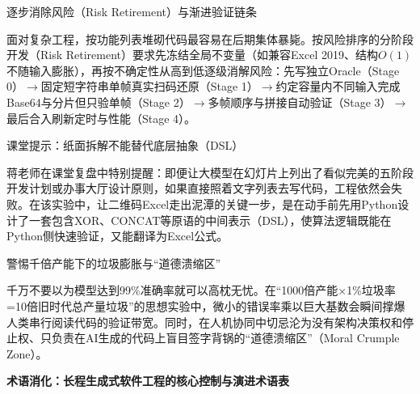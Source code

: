 \documentclass[UTF8,a4paper,11pt,fontset=fandol]{ctexart}
\begin{document}
\begin{importantbox}{逐步消除风险（Risk Retirement）与渐进验证链条}

面对复杂工程，按功能列表堆砌代码最容易在后期集体暴毙。按风险排序的分阶段开发（Risk Retirement）要求先冻结全局不变量（如兼容Excel 2019、结构\(O(1)\)不随输入膨胀），再按不确定性从高到低逐级消解风险：先写独立Oracle（Stage 0）\ensuremath{\rightarrow}固定短字符串单帧真实扫码还原（Stage 1）\ensuremath{\rightarrow}约定容量内不同输入完成Base64与分片但只验单帧（Stage 2）\ensuremath{\rightarrow}多帧顺序与拼接自动验证（Stage 3）\ensuremath{\rightarrow}最后合入刷新定时与性能（Stage 4）。

\end{importantbox}

\begin{knowledgebox}{课堂提示：纸面拆解不能替代底层抽象（DSL）}

蒋老师在课堂复盘中特别提醒：即便让大模型在幻灯片上列出了看似完美的五阶段开发计划或办事大厅设计原则，如果直接照着文字列表去写代码，工程依然会失败。在该实验中，让二维码Excel走出泥潭的关键一步，是在动手前先用Python设计了一套包含XOR、CONCAT等原语的中间表示（DSL），使算法逻辑既能在Python侧快速验证，又能翻译为Excel公式。

\end{knowledgebox}

\begin{warningbox}{警惕千倍产能下的垃圾膨胀与“道德溃缩区”}

千万不要以为模型达到99\%准确率就可以高枕无忧。在“1000倍产能\ensuremath{\times}1\%垃圾率=10倍旧时代总产量垃圾”的思想实验中，微小的错误率乘以巨大基数会瞬间撑爆人类串行阅读代码的验证带宽。同时，在人机协同中切忌沦为没有架构决策权和停止权、只负责在AI生成的代码上盲目签字背锅的“道德溃缩区”（Moral Crumple Zone）。

\end{warningbox}

\par{}\textbf{术语消化：长程生成式软件工程的核心控制与演进术语表}
\end{document}
